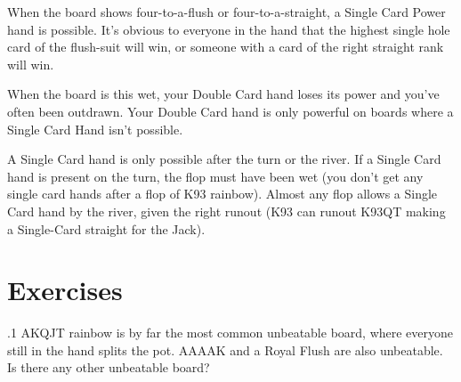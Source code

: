 When the board shows four-to-a-flush or four-to-a-straight, a Single
Card Power hand is possible. It's obvious to everyone in the hand that
the highest single hole card of the flush-suit will win, or someone
with a card of the right straight rank will win.

When the board is this wet, your Double Card hand loses its power and
you've often been outdrawn. Your Double Card hand is only powerful on
boards where a Single Card Hand isn't possible.

A Single Card hand is only possible after the turn or the river. If a
Single Card hand is present on the turn, the flop must have been wet
(you don't get any single card hands after a flop of K93
rainbow). Almost any flop allows a Single Card hand by the river,
given the right runout (K93 can runout K93QT making a Single-Card
straight for the Jack).

\section{Exercises}

.1 AKQJT rainbow is by far the most common unbeatable
board, where everyone still in the hand splits the pot. AAAAK and a
Royal Flush are also unbeatable. Is there any other unbeatable board?
